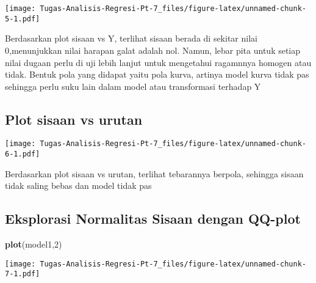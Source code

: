 \documentclass[
]{article}
\newenvironment{Shaded}{\begin{snugshade}}{\end{snugshade}}
\newcommand{\AttributeTok}[1]{\textcolor[rgb]{0.13,0.29,0.53}{#1}}
\newcommand{\DecValTok}[1]{\textcolor[rgb]{0.00,0.00,0.81}{#1}}
\newcommand{\FunctionTok}[1]{\textcolor[rgb]{0.13,0.29,0.53}{\textbf{#1}}}
\newcommand{\NormalTok}[1]{#1}
\newcommand{\SpecialCharTok}[1]{\textcolor[rgb]{0.81,0.36,0.00}{\textbf{#1}}}
\newcommand{\StringTok}[1]{\textcolor[rgb]{0.31,0.60,0.02}{#1}}
\begin{document}
\texttt{[image: Tugas-Analisis-Regresi-Pt-7\_files/figure-latex/unnamed-chunk-5-1.pdf]}

Berdasarkan plot sisaan vs Y, terlihat sisaan berada di sekitar nilai
0,menunjukkan nilai harapan galat adalah nol. Namun, lebar pita untuk
setiap nilai dugaan perlu di uji lebih lanjut untuk mengetahui ragamnnya
homogen atau tidak. Bentuk pola yang didapat yaitu pola kurva, artinya
model kurva tidak pas sehingga perlu suku lain dalam model atau
transformasi terhadap Y

\hypertarget{plot-sisaan-vs-urutan}{%
\subsection{Plot sisaan vs urutan}\label{plot-sisaan-vs-urutan}}

\begin{Shaded}
\end{Shaded}

\texttt{[image: Tugas-Analisis-Regresi-Pt-7\_files/figure-latex/unnamed-chunk-6-1.pdf]}

Berdasarkan plot sisaan vs urutan, terlihat tebarannya berpola, sehingga
sisaan tidak saling bebas dan model tidak pas

\hypertarget{eksplorasi-normalitas-sisaan-dengan-qq-plot}{%
\subsection{Eksplorasi Normalitas Sisaan dengan
QQ-plot}\label{eksplorasi-normalitas-sisaan-dengan-qq-plot}}

\begin{Shaded}
\begin{Highlighting}[]
\FunctionTok{plot}\NormalTok{(model1,}\DecValTok{2}\NormalTok{)}
\end{Highlighting}
\end{Shaded}

\texttt{[image: Tugas-Analisis-Regresi-Pt-7\_files/figure-latex/unnamed-chunk-7-1.pdf]}
\end{document}
